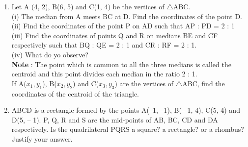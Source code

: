 \documentclass[12pt]{article}
\begin{document}
\begin{enumerate}
\item Let A (4, 2), B(6, 5) and C(1, 4) be the vertices of $\triangle$ABC.\\
(i) The median from A meets BC at D. Find the coordinates of the point D.\\
(ii) Find the coordinates of the point P on AD such that AP : PD = 2 : 1\\
(iii) Find the coordinates of points Q and R on medians BE and CF respectively such that BQ : QE = 2 : 1 and CR : RF = 2 : 1.\\
(iv) What do yo observe?\\
\textbf{Note} : The point which is common to all the three medians is called the centroid and this point divides each median in the ratio 2 : 1.\\

If A($x_{1},y_{1}$), B($x_{2},y_{2}$) and C($x_{3},y_{3}$) are the vertices of $\triangle$ABC, find the coordinates of the centroid of the triangle.

\item ABCD is a rectangle formed by the points A(–1, –1), B(– 1, 4), C(5, 4) and D(5, – 1). P, Q,
R and S are the mid-points of AB, BC, CD and DA respectively. Is the quadrilateral PQRS a square? a rectangle? or a rhombus? Justify your answer.


\end{enumerate}
\end{document}
